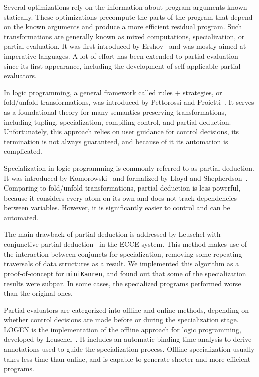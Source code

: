 \documentclass[crop=false]{standalone}
\begin{document}
Several optimizations rely on the information about program arguments known statically. 
These optimizations precompute the parts of the program that depend on the known arguments and produce a more efficient residual program. 
Such transformations are generally known as mixed computations, specialization, or partial evaluation. 
It was first introduced by Ershov~\cite{ERSHOV198241} and was mostly aimed at imperative languages. 
A lot of effort has been extended to partial evaluation~\cite{jones1993partial,intro2partialEvaluation} since its first appearance, including the development of self-applicable partial evaluators. 

In logic programming, a general framework called rules + strategies, or fold/unfold transformations, was introduced by Pettorossi and Proietti~\cite{pettorossi1996rules,pettorossi1994transformation}. 
It serves as a foundational theory for many semantics-preserving transformations, including tupling, specialization, compiling control, and partial deduction. 
Unfortunately, this approach relies on user guidance for control decisions, its termination is not always guaranteed, and because of it its automation is complicated. 

Specialization in logic programming is commonly referred to as partial deduction. 
It was introduced by Komorowski~\cite{komorowski1982partial} and formalized by Lloyd and Shepherdson~\cite{lloyd1991partial}. 
Comparing to fold/unfold transformations, partial deduction is less powerful, because it considers every atom on its own and does not track dependencies between variables. 
However, it is significantly easier to control and can be automated. 

The main drawback of partial deduction is addressed by Leuschel with conjunctive partial deduction~\cite{de1999conjunctive} in the ECCE system. 
This method makes use of the interaction between conjuncts for specialization, removing some repeating traversals of data structures as a result. 
We implemented this algorithm as a proof-of-concept for \texttt{miniKanren}, and found out that some of the specialization results were subpar.
In some cases, the specialized programs performed worse than the original ones. 

Partial evaluators are categorized into offline and online methods, depending on whether control decisions are made before or during the specialization stage. 
LOGEN is the implementation of the offline approach for logic programming, developed by Leuschel~\cite{leuschel2004offline}. 
It includes an automatic binding-time analysis to derive annotations used to guide the specialization process. 
Offline specialization usually takes less time than online, and is capable to generate shorter and more efficient programs. 
\end{document}
